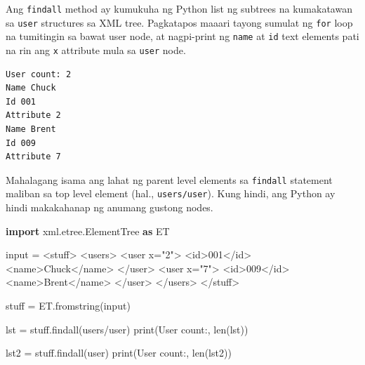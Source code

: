\documentclass[10pt,]{book}
\newenvironment{Shaded}{}{}
\newcommand{\BuiltInTok}[1]{\textcolor[rgb]{0.00,0.50,0.00}{#1}}
\newcommand{\ImportTok}[1]{\textcolor[rgb]{0.00,0.50,0.00}{\textbf{#1}}}
\newcommand{\NormalTok}[1]{#1}
\newcommand{\OperatorTok}[1]{\textcolor[rgb]{0.40,0.40,0.40}{#1}}
\newcommand{\StringTok}[1]{\textcolor[rgb]{0.25,0.44,0.63}{#1}}
\begin{document}
Ang \texttt{findall} method ay kumukuha ng Python list ng subtrees na
kumakatawan sa \texttt{user} structures sa XML tree. Pagkatapos maaari
tayong sumulat ng \texttt{for} loop na tumitingin sa bawat user node, at
nagpi-print ng \texttt{name} at \texttt{id} text elements pati na rin
ang \texttt{x} attribute mula sa \texttt{user} node.

{\small
\begin{verbatim}
User count: 2
Name Chuck
Id 001
Attribute 2
Name Brent
Id 009
Attribute 7
\end{verbatim}
}

Mahalagang isama ang lahat ng parent level elements sa \texttt{findall}
statement maliban sa top level element (hal., \texttt{users/user}). Kung
hindi, ang Python ay hindi makakahanap ng anumang gustong nodes.

\begin{Shaded}
\begin{Highlighting}[]
\ImportTok{import}\NormalTok{ xml.etree.ElementTree }\ImportTok{as}\NormalTok{ ET}

\BuiltInTok{input} \OperatorTok{=} \StringTok{\textquotesingle{}\textquotesingle{}\textquotesingle{}}
\StringTok{\textless{}stuff\textgreater{}}
\StringTok{  \textless{}users\textgreater{}}
\StringTok{    \textless{}user x="2"\textgreater{}}
\StringTok{      \textless{}id\textgreater{}001\textless{}/id\textgreater{}}
\StringTok{      \textless{}name\textgreater{}Chuck\textless{}/name\textgreater{}}
\StringTok{    \textless{}/user\textgreater{}}
\StringTok{    \textless{}user x="7"\textgreater{}}
\StringTok{      \textless{}id\textgreater{}009\textless{}/id\textgreater{}}
\StringTok{      \textless{}name\textgreater{}Brent\textless{}/name\textgreater{}}
\StringTok{    \textless{}/user\textgreater{}}
\StringTok{  \textless{}/users\textgreater{}}
\StringTok{\textless{}/stuff\textgreater{}\textquotesingle{}\textquotesingle{}\textquotesingle{}}

\NormalTok{stuff }\OperatorTok{=}\NormalTok{ ET.fromstring(}\BuiltInTok{input}\NormalTok{)}

\NormalTok{lst }\OperatorTok{=}\NormalTok{ stuff.findall(}\StringTok{\textquotesingle{}users/user\textquotesingle{}}\NormalTok{)}
\BuiltInTok{print}\NormalTok{(}\StringTok{\textquotesingle{}User count:\textquotesingle{}}\NormalTok{, }\BuiltInTok{len}\NormalTok{(lst))}

\NormalTok{lst2 }\OperatorTok{=}\NormalTok{ stuff.findall(}\StringTok{\textquotesingle{}user\textquotesingle{}}\NormalTok{)}
\BuiltInTok{print}\NormalTok{(}\StringTok{\textquotesingle{}User count:\textquotesingle{}}\NormalTok{, }\BuiltInTok{len}\NormalTok{(lst2))}
\end{Highlighting}
\end{Shaded}
\end{document}
